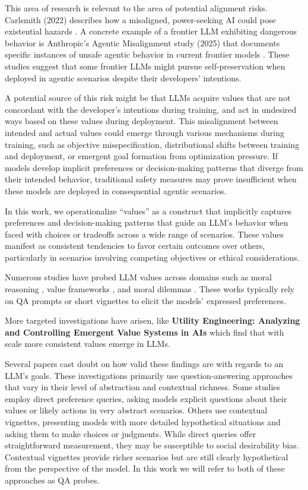 \documentclass[11pt]{article}
\begin{document}
This area of research is relevant to the area of potential alignment risks. Carlsmith (2022) describes how a misaligned, power-seeking AI could pose existential hazards \cite{carlsmith2022power}. A concrete example of a frontier LLM exhibiting dangerous behavior is Anthropic's Agentic Misalignment study (2025) that documents specific instances of unsafe agentic behavior in current frontier models \cite{lynch2025agentic}. These studies suggest that some frontier LLMs might pursue self-preservation when deployed in agentic scenarios despite their developers' intentions.

A potential source of this risk might be that LLMs acquire values that are not concordant with the developer's intentions during training, and act in undesired ways based on these values during deployment. This misalignment between intended and actual values could emerge through various mechanisms during training, such as objective misspecification, distributional shifts between training and deployment, or emergent goal formation from optimization pressure. If models develop implicit preferences or decision-making patterns that diverge from their intended behavior, traditional safety measures may prove insufficient when these models are deployed in consequential agentic scenarios.

In this work, we operationalize ``values'' as a construct that implicitly captures preferences and decision-making patterns that guide an LLM's behavior when faced with choices or tradeoffs across a wide range of scenarios. These values manifest as consistent tendencies to favor certain outcomes over others, particularly in scenarios involving competing objectives or ethical considerations. 

Numerous studies have probed LLM values across domains such as moral reasoning \cite{hendrycks2021aligning}, value frameworks \cite{yao2024fulcra}, and moral dilemmas \cite{scherrer2023moral}. These works typically rely on QA prompts or short vignettes to elicit the models' expressed preferences.

More targeted investigations have arisen, like \textbf{Utility Engineering: Analyzing and Controlling Emergent Value Systems in AIs} \cite{mazeika2025utility} which find that with scale more consistent values emerge in LLMs.

Several papers cast doubt on how valid these findings are with regards to an LLM's goals. These investigations primarily use question-answering approaches that vary in their level of abstraction and contextual richness. Some studies employ direct preference queries, asking models explicit questions about their values or likely actions in very abstract scenarios. Others use contextual vignettes, presenting models with more detailed hypothetical situations and asking them to make choices or judgments. While direct queries offer straightforward measurement, they may be susceptible to social desirability bias. Contextual vignettes provide richer scenarios but are still clearly hypothetical from the perspective of the model. In this work we will refer to both of these approaches as QA probes.
\end{document}
